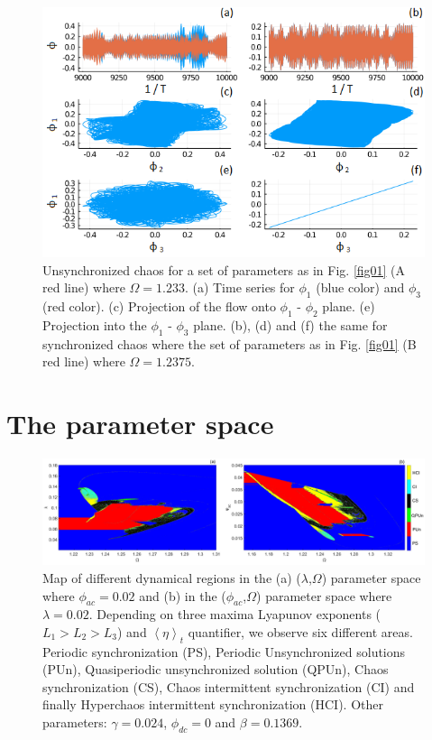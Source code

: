 \documentclass[aps,pre,reprint,groupedaddress]{revtex4-1}
\begin{document}
\begin{figure}
	\includegraphics[scale=0.55]{Fig02}%
	\caption{Unsynchronized chaos for a set of parameters as in Fig. \ref{fig01} (A red line) where $ \Omega = 1.233$. (a) Time series for $\phi_{1}$ (blue color) and $\phi_{3}$ (red color). (c) Projection of the flow onto $\phi_{1}$ - $\phi_{2}$ plane. (e) Projection into the $\phi_{1}$ - $\phi_{3}$ plane. (b), (d) and (f) the same for synchronized chaos where the set of parameters as in Fig. \ref{fig01} (B red line) where $\Omega = 1.2375$.} \label{fig02}
\end{figure}


\section{The parameter space}

\begin{figure}
	\includegraphics[scale=0.25]{Fig03}
	\caption{Map of different dynamical regions in the (a) ($\lambda$,$\Omega$) parameter space where $\phi_{ac} = 0.02$ and (b) in the ($\phi_{ac}$,$\Omega$) parameter space where $\lambda = 0.02$. Depending on three maxima Lyapunov exponents ($L_{1}>L_{2}>L_{3}$) and $\left\langle \eta\right\rangle _{t}$ quantifier, we observe six different areas. 
	Periodic synchronization (PS), Periodic Unsynchronized solutions (PUn), 
	Quasiperiodic unsynchronized solution (QPUn), 
	Chaos synchronization (CS), 
	Chaos intermittent synchronization (CI) and finally 
	Hyperchaos intermittent synchronization (HCI). Other parameters: $\gamma=0.024$, $\phi_{dc}=0$ and $\beta=0.1369$.} \label{fig03}
\end{figure}
\end{document}
